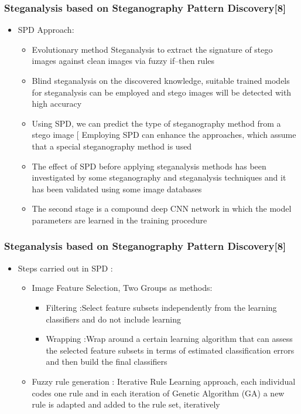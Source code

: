 \documentclass{beamer} %
\theoremstyle{definition} %
\begin{document}
\begin{frame}
\frametitle{Steganalysis based on Steganography Pattern Discovery[8] }
\begin{itemize}
	\item SPD Approach:
	\begin{itemize}
		\item Evolutionary method Steganalysis to extract the signature of stego images against clean images via fuzzy if–then rules  
		
		\item Blind steganalysis on the discovered knowledge, suitable trained models for steganalysis can be employed and stego images will be detected with high accuracy   
		\item Using SPD, we can predict the type of steganography method from a stego image [  Employing SPD can enhance the approaches, which
		assume that a special steganography method is used 
		\item The effect of SPD before applying steganalysis methods has been investigated by some steganography and steganalysis techniques and it has been validated using some image databases  
		\item The second stage is a compound deep CNN network in which the model parameters are learned in the training procedure 
	\end{itemize}
\end{itemize}
\end{frame}

\begin{frame}
\frametitle{Steganalysis based on Steganography Pattern Discovery[8]  }
\begin{itemize}
	\item Steps carried out in SPD : 
	\begin{itemize}
		\item Image Feature Selection, Two Groups as methods: 
		\begin{itemize}
			\item Filtering :Select feature subsets independently from the learning classifiers and do not include learning 
			\item Wrapping :Wrap around a certain learning algorithm that can
			assess the selected feature subsets in terms of estimated classification errors and then build the final classifiers  
		\end{itemize}
		\item Fuzzy rule generation : Iterative Rule Learning approach, each individual codes one rule and in each iteration of Genetic Algorithm (GA) a new rule is adapted and added to the rule set, iteratively  
	\end{itemize} 
\end{itemize}
\end{frame}
\end{document}
